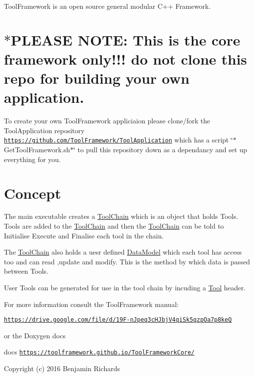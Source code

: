 

Tool\-Framework is an open source general modular C++ Framework.

\section*{$\ast$\-P\-L\-E\-A\-S\-E N\-O\-T\-E\-: This is the core framework only!!! do not clone this repo for building your own application.}

To create your own Tool\-Framework appliciaion please clone/fork the Tool\-Application repository \href{https://github.com/ToolFramework/ToolApplication}{\tt https\-://github.\-com/\-Tool\-Framework/\-Tool\-Application} which has a script \char`\"{}$\ast$\-Get\-Tool\-Framework.\-sh$\ast$\char`\"{} to pull this repository down as a dependancy and set up everything for you.



 \section*{Concept}





The main executable creates a \hyperlink{classToolChain}{Tool\-Chain} which is an object that holds Tools. Tools are added to the \hyperlink{classToolChain}{Tool\-Chain} and then the \hyperlink{classToolChain}{Tool\-Chain} can be told to Initialise Execute and Finalise each tool in the chain.

The \hyperlink{classToolChain}{Tool\-Chain} also holds a uesr defined \hyperlink{classDataModel}{Data\-Model} which each tool has access too and can read ,update and modify. This is the method by which data is passed between Tools.

User Tools can be generated for use in the tool chain by incuding a \hyperlink{classTool}{Tool} header.

For more information consult the Tool\-Framework manual\-:

\href{https://drive.google.com/file/d/19F-nJpeq3cHJbjV4qiSk5qzpOa7p8keQ}{\tt https\-://drive.\-google.\-com/file/d/19\-F-\/n\-Jpeq3c\-H\-Jbj\-V4qi\-Sk5qzp\-Oa7p8ke\-Q}

or the Doxygen docs

docs \href{https://toolframework.github.io/ToolFrameworkCore/}{\tt https\-://toolframework.\-github.\-io/\-Tool\-Framework\-Core/}

Copyright (c) 2016 Benjamin Richards 